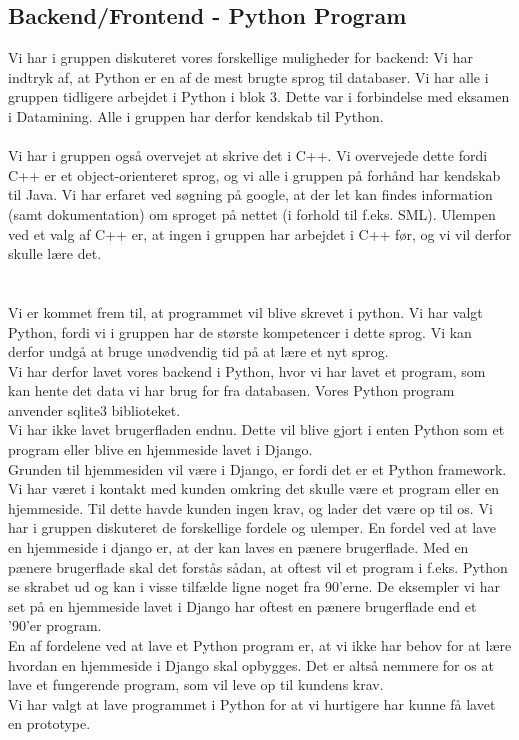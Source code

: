 \documentclass[a4paper]{article}
\begin{document}
\subsection{Backend/Frontend - Python Program}
Vi har i gruppen diskuteret vores forskellige muligheder for backend:
Vi har indtryk af, at Python er en af de mest brugte sprog til databaser. Vi har alle i gruppen tidligere arbejdet i Python i blok 3. Dette var i forbindelse med eksamen i Datamining. Alle i gruppen har derfor kendskab til Python.\\ \\
Vi har i gruppen også overvejet at skrive det i C++. Vi overvejede dette fordi C++ er et object-orienteret sprog, og vi alle i gruppen på forhånd har kendskab til Java. Vi har erfaret ved søgning på google, at der let kan findes information (samt dokumentation) om sproget på nettet (i forhold til f.eks. SML). Ulempen ved et valg af C++ er, at ingen i gruppen har arbejdet i C++ før, og vi vil derfor skulle lære det. \\ \\ \\
Vi er kommet frem til, at programmet vil blive skrevet i python. Vi har valgt Python, fordi vi i gruppen har de største kompetencer i dette sprog. Vi kan derfor undgå at bruge unødvendig tid på at lære et nyt sprog. \\
Vi har derfor lavet vores backend i Python, hvor vi har lavet et program, som kan hente det data vi har brug for fra databasen. Vores Python program anvender sqlite3 biblioteket. \\
Vi har ikke lavet brugerfladen endnu. Dette vil blive gjort i enten Python som et program eller blive en hjemmeside lavet i Django.\\ Grunden til hjemmesiden vil være i Django, er fordi det er et Python framework. Vi har været i kontakt med kunden omkring det skulle være et program eller en hjemmeside. Til dette havde kunden ingen krav, og lader det være op til os. Vi har i gruppen diskuteret de forskellige fordele og ulemper. En fordel ved at lave en hjemmeside i django er, at der kan laves en pænere brugerflade. Med en pænere brugerflade skal det forstås sådan, at oftest vil et program i f.eks. Python se skrabet ud og kan i visse tilfælde ligne noget fra 90'erne. De eksempler vi har set på en hjemmeside lavet i Django har oftest en pænere brugerflade end et '90'er program. \\
En af fordelene ved at lave et Python program er, at vi ikke har behov for at lære hvordan en hjemmeside i Django skal opbygges. Det er altså nemmere for os at lave et fungerende program, som vil leve op til kundens krav. \\
Vi har valgt at lave programmet i Python for at vi hurtigere har kunne få lavet en prototype.
\end{document}
